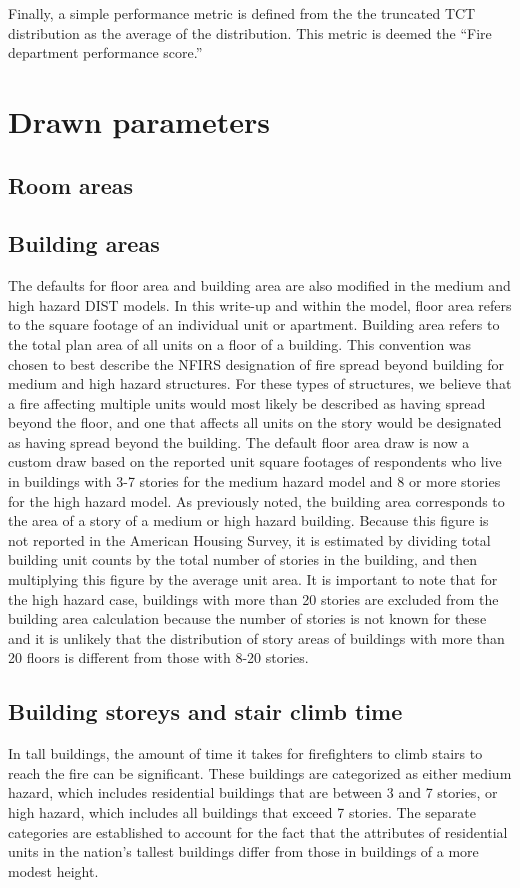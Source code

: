 \documentclass[12pt,oneside]{book}
\begin{document}
Finally, a simple performance metric is defined from the the truncated TCT distribution as the average of the distribution. This metric is deemed the ``Fire department performance score.''

\section{Drawn parameters}
\subsection{Room areas}
\subsection{Building areas}
The defaults for floor area and building area are also modified in the medium and high hazard DIST models. In this write-up and within the model, floor area refers to the square footage of an individual unit or apartment.  Building area refers to the total plan area of all units on a floor of a building. This convention was chosen to best describe the NFIRS designation of fire spread beyond building for medium and high hazard structures.  For these types of structures, we believe that a fire affecting multiple units would most likely be described as having spread beyond the floor, and one that affects all units on the story would be designated as having spread beyond the building.  The default floor area draw is now a custom draw based on the reported unit square footages of respondents who live in buildings with 3-7 stories for the medium hazard model and 8 or more stories for the high hazard model. As previously noted, the building area corresponds to the area of a story of a medium or high hazard building. Because this figure is not reported in the American Housing Survey, it is estimated by dividing total building unit counts by the total number of stories in the building, and then multiplying this figure by the average unit area. It is important to note that for the high hazard case, buildings with more than 20 stories are excluded from the building area calculation because the number of stories is not known for these and it is unlikely that the distribution of story areas of buildings with more than 20 floors is different from those with 8-20 stories.   

\subsection{Building storeys and stair climb time}
In tall buildings, the amount of time it takes for firefighters to climb stairs to reach the fire can be significant. These buildings are categorized as either medium hazard, which includes residential buildings that are between 3 and 7 stories, or high hazard, which includes all buildings that exceed 7 stories. The separate categories are established to account for the fact that the attributes of residential units in the nation’s tallest buildings differ from those in buildings of a more modest height. 
\end{document}
